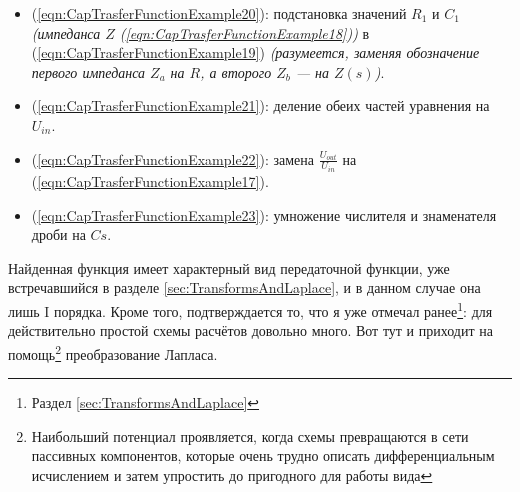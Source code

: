 \documentclass[a4paper, 10pt, final]{article} %
\begin{document}
    \begin{itemize}
        \item (\ref{eqn:CapTrasferFunctionExample20}): подстановка значений $R_1$ и $C_1$ \emph{(импеданса $Z$ (\ref{eqn:CapTrasferFunctionExample18}))} в (\ref{eqn:CapTrasferFunctionExample19}) \emph{(разумеется, заменяя обозначение первого импеданса $Z_a$ на $R$, а второго $Z_b$ --- на $Z(s)$)}.
        \item (\ref{eqn:CapTrasferFunctionExample21}): деление обеих частей уравнения на $U_{in}$.
        \item (\ref{eqn:CapTrasferFunctionExample22}): замена $\frac{U_{out}}{U_{in}}$ на (\ref{eqn:CapTrasferFunctionExample17}).
        \item (\ref{eqn:CapTrasferFunctionExample23}): умножение числителя и знаменателя дроби на $C s$.
    \end{itemize}
    \noindent Найденная функция имеет характерный вид передаточной функции, уже встречавшийся в разделе \ref{sec:TransformsAndLaplace}, и в данном случае она лишь I порядка.
    Кроме того, подтверждается то, что я уже отмечал ранее\footnote{Раздел \ref{sec:TransformsAndLaplace}}: для действительно простой схемы расчётов довольно много.
    Вот тут и приходит на помощь\footnote{Наибольший потенциал проявляется, когда схемы превращаются в сети пассивных компонентов, которые очень трудно описать дифференциальным исчислением и затем упростить до пригодного для работы вида} преобразование Лапласа.
\end{document}

